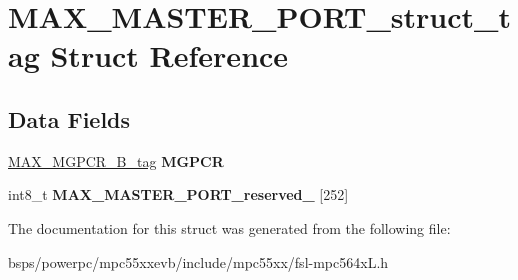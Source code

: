 \hypertarget{structMAX__MASTER__PORT__struct__tag}{}\section{M\+A\+X\+\_\+\+M\+A\+S\+T\+E\+R\+\_\+\+P\+O\+R\+T\+\_\+struct\+\_\+tag Struct Reference}
\label{structMAX__MASTER__PORT__struct__tag}
\subsection*{Data Fields}
\begin{DoxyCompactItemize}
\item 
\mbox{\label{structMAX__MASTER__PORT__struct__tag_a2bcf8ab27ebdf9383224fa4aafdd67b8}} 
\mbox{\hyperlink{unionMAX__MGPCR__32B__tag}{M\+A\+X\+\_\+\+M\+G\+P\+C\+R\+\_\+B\+\_\+tag}} {\bfseries M\+G\+P\+CR}
\item 
\mbox{\label{structMAX__MASTER__PORT__struct__tag_a7d18ad19725fa539344f45b91382c15d}} 
int8\+\_\+t {\bfseries M\+A\+X\+\_\+\+M\+A\+S\+T\+E\+R\+\_\+\+P\+O\+R\+T\+\_\+reserved\+\_} \mbox{[}252\mbox{]}
\end{DoxyCompactItemize}


The documentation for this struct was generated from the following file\+:\begin{DoxyCompactItemize}
\item 
bsps/powerpc/mpc55xxevb/include/mpc55xx/fsl-\/mpc564x\+L.\+h\end{DoxyCompactItemize}

